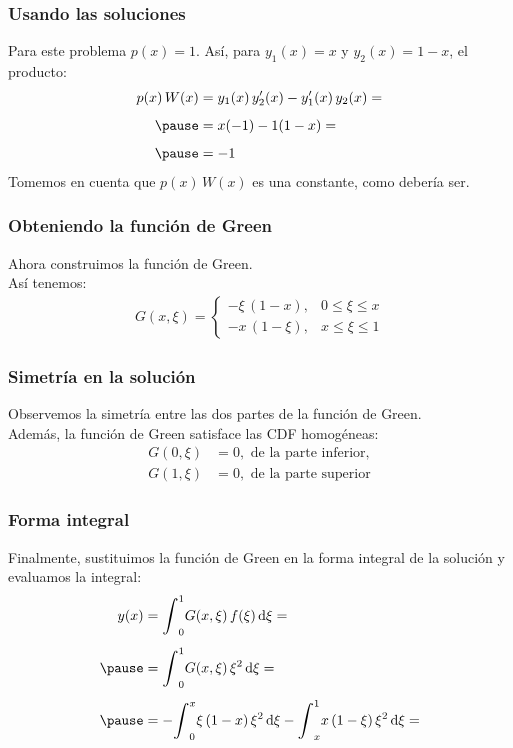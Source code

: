\documentclass[12pt]{beamer}
\begin{document}
\begin{frame}
\frametitle{Usando las soluciones}
Para este problema $p (x) = 1$. \pause Así, para $y_{1} (x) = x$ y $y_{2} (x) = 1 - x$, el producto:
\pause
\begin{eqnarray*}
\begin{aligned}
p (x) \, W (x) &=  y_{1} (x) \, \pderivada{y}_{2} (x) - \pderivada{y}_{1} (x) \, y_{2} (x) = \\[0.5em] \pause
&= x (-1) -  1(1 - x) = \\[0.5em] \pause
&= - 1
\end{aligned}
\end{eqnarray*}
Tomemos en cuenta que $p (x) \, W (x)$ es una constante, como debería ser.
\end{frame}
\begin{frame}
\frametitle{Obteniendo la función de Green}
Ahora construimos la función de Green.
\\
\bigskip
\pause
Así tenemos:
\pause
\begin{align}
G (x, \xi) = \begin{cases}
- \xi \, (1 - x), & 0 \leq \xi \leq x \\
- x \, (1 - \xi), & x \leq \xi \leq 1
\end{cases}
\label{eq:ecuacion_07_35}
\end{align}
\end{frame}
\begin{frame}
\frametitle{Simetría en la solución}
Observemos la simetría entre las dos partes de la función de Green. 
\\
\bigskip
\pause
Además, la función de Green satisface las CDF homogéneas: 
\pause
\begin{align*}
G (0, \xi) &= 0, \mbox{ de la parte inferior}, \\[0.5em]
G (1, \xi) &= 0, \mbox{ de la parte superior}
\end{align*}
\end{frame}
\begin{frame}
\frametitle{Forma integral}
Finalmente, sustituimos la función de Green en la forma integral de la solución y evaluamos la integral:
\pause
\begin{eqnarray*}
\begin{aligned}[b]
y (x) &= \scaleint{6ex}_{0}^{1} G (x, \xi) \, f (\xi) \dd{\xi} = \\[0.5em] \pause
&= \scaleint{6ex}_{0}^{1} G (x, \xi) \, \xi^{2} \dd{\xi} = \\[0.5em] \pause
&= - \scaleint{6ex}_{0}^{x} \xi \, (1 - x) \, \xi^{2} \dd{\xi} - \scaleint{6ex}_{x}^{1} x \, (1 - \xi) \, \xi^{2} \dd{\xi} = \\[0.5em]
\end{aligned}
\end{eqnarray*}
\end{frame}
\end{document}
